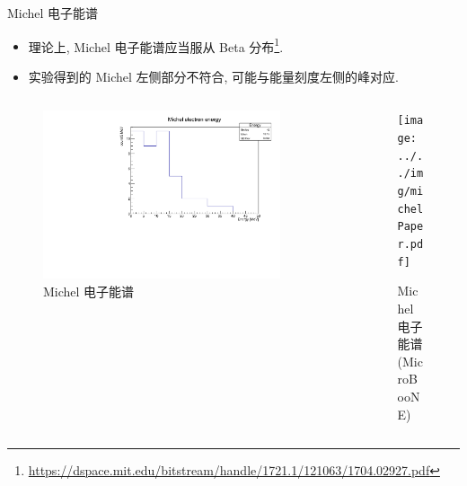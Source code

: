 \documentclass[10pt]{beamer}
\begin{document}
\begin{frame}[label={sec:orgffd5cf0}]{Michel 电子能谱}
\begin{itemize}
\item 理论上, Michel 电子能谱应当服从 Beta 分布\footnote{\url{https://dspace.mit.edu/bitstream/handle/1721.1/121063/1704.02927.pdf}}.
\item 实验得到的 Michel 左侧部分不符合, 可能与能量刻度左侧的峰对应.
\end{itemize}

\begin{columns}
\begin{column}{0.5\columnwidth}
\begin{figure}[htbp]
\centering
\includegraphics[width=0.9\textwidth]{../../mu/michel/michel.pdf}
\caption{Michel 电子能谱}
\end{figure}
\end{column}

\begin{column}{0.5\columnwidth}
\begin{figure}[htbp]
\centering
\texttt{[image: ../../img/michelPaper.pdf]}
\caption{Michel 电子能谱(MicroBooNE)}
\end{figure}
\end{column}
\end{columns}
\end{frame}
\end{document}
